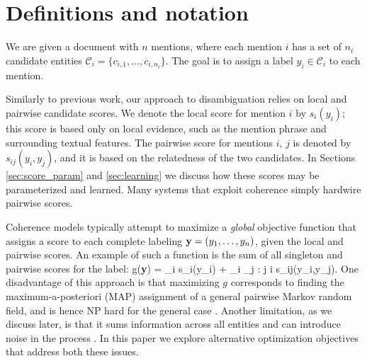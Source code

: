 \section{Definitions and notation}
\label{sec:notation}

We are given a document with $n$ mentions, where each mention $i$ has a set of $n_i$ candidate entities $\mathcal{C}_i = \{c_{i,1}, ..., c_{i,n_i}\}$. The goal is to assign a label $y_i \in \mathcal{C}_i$ to each mention.

Similarly to previous work, our approach to disambiguation relies on local and pairwise candidate scores. We denote the local score for mention $i$ by $s_i(y_i)$; this score is based only on local evidence, such as the mention phrase and surrounding textual features. The pairwise score for mentions $i$, $j$ is denoted by $s_{ij}(y_i, y_j)$,  and it is based on the relatedness of the two candidates. In Sections \ref{sec:score_param} and \ref{sec:learning} we discuss how these scores may be parameterized and learned.  Many systems that exploit coherence \cite{Cucerzan07,Milne2008,KulkarniSRC09} simply hardwire pairwise scores.


Coherence models typically attempt to maximize a {\em global} objective function that assigns a score to each complete labeling ${\bf y} = (y_1,\ldots, y_n)$, given the local and pairwise scores. An example of such a function is the sum of all singleton and pairwise scores for the label:
\be
g({\bf y}) = \sum_i s_i(y_i) + \sum_i \sum_{j :  j \neq i} s_{ij}(y_i,y_j).
\label{eq:global_obj}
\ee 
One disadvantage of this approach is that maximizing $g$ corresponds to finding the maximum-a-posteriori (MAP) assignment of a general pairwise Markov random field, and is hence
NP hard for the general case \cite{wainwright2008graphical}. Another limitation, as we discuss later, is that it sums information across all entities and can introduce noise in the process . In this paper we explore alternative optimization objectives that address both these issues.



